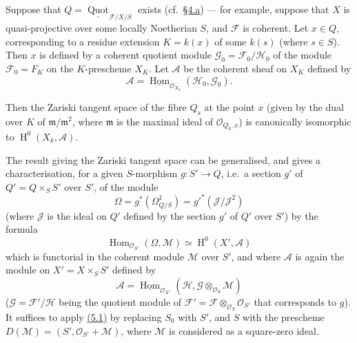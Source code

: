 \documentclass{article}
\newcommand{\oldpage}[1]{\marginpar{\footnotesize$\Big\vert$ \textit{p.~#1}}}
\theoremstyle{definition}
\theoremstyle{definition}
\theoremstyle{definition}
\theoremstyle{definition}
\theoremstyle{remark}
\begin{document}
\leavevmode{}%
Suppose that \(Q=\underline{\operatorname{Quot}}_{{\mathscr{F}}/X/S}\) exists (cf.~\protect\hyperlink{fga-3-iv-section-4}{§4.a}) --- for example, suppose that \(X\) is quasi-projective over some locally Noetherian \(S\), and \({\mathscr{F}}\) is coherent.
Let \(x\in Q\), corresponding to a residue extension \(K=k(x)\) of some \(k(s)\) (where \(s\in S\)).
\oldpage{221-22}Then \(x\) is defined by a coherent quotient module \({\mathscr{G}}_0={\mathscr{F}}_0/{\mathscr{H}}_0\) of the module \({\mathscr{F}}_0=F_K\) on the \(K\)-prescheme \(X_K\).
Let \({\mathscr{A}}\) be the coherent sheaf on \(X_K\) defined by
\[
  {\mathscr{A}} = \underline{\operatorname{Hom}}_{{\mathscr{O}}_{X_0}}({\mathscr{H}}_0,{\mathscr{G}}_0).
\]

Then the Zariski tangent space of the fibre \(Q_s\) at the point \(x\) (given by the dual over \(K\) of \({\mathfrak{m}}/{\mathfrak{m}}^2\), where \({\mathfrak{m}}\) is the maximal ideal of \({\mathscr{O}}_{Q_k,x}\)) is canonically isomorphic to \(\operatorname{H}^0(X_k,{\mathscr{A}})\).

The result giving the Zariski tangent space can be generalised, and gives a characterisation, for a given \(S\)-morphism \(g\colon S'\to Q\), i.e.~a section \(g'\) of \(Q'=Q\times_S S'\) over \(S'\), of the module
\[
  \Omega
  = g^*(\Omega_{Q/S}^1)
  = {g'}^*({\mathscr{J}}/{\mathscr{J}}^2)
\]
(where \({\mathscr{J}}\) is the ideal on \(Q'\) defined by the section \(g'\) of \(Q'\) over \(S'\)) by the formula
\[
  \operatorname{Hom}_{{\mathscr{O}}_{S'}}(\Omega,{\mathscr{M}})
  \simeq \operatorname{H}^0(X',{\mathscr{A}})
\]
which is functorial in the coherent module \({\mathscr{M}}\) over \(S'\), and where \({\mathscr{A}}\) is again the module on \(X'=X\times_S S'\) defined by
\[
  {\mathscr{A}} = \underline{\operatorname{Hom}}_{{\mathscr{O}}_{X'}}({\mathscr{H}},{\mathscr{G}}\otimes_{{\mathscr{O}}_S}{\mathscr{M}})
\]
(\({\mathscr{G}}={\mathscr{F}}'/{\mathscr{H}}\) being the quotient module of \({\mathscr{F}}'={\mathscr{F}}\otimes_{{\mathscr{O}}_S}{\mathscr{O}}_{S'}\) that corresponds to \(g\)).
It suffices to apply \protect\hyperlink{fga-3-iv-proposition-5.1}{(5.1)} by replacing \(S_0\) with \(S'\), and \(S\) with the prescheme \(D({\mathscr{M}})=(S',{\mathscr{O}}_{S'}+{\mathscr{M}})\), where \({\mathscr{M}}\) is considered as a square-zero ideal.
\end{document}
